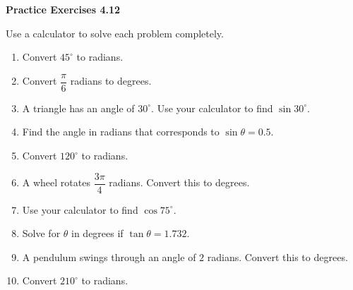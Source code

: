\vspace{0.3ex}
\noindent\textbf{Practice Exercises 4.12}

\vspace{0.2ex}

Use a calculator to solve each problem completely.

\begin{enumerate}
    \item Convert \(45^\circ\) to radians.
    \item Convert \( \dfrac{\pi}{6} \) radians to degrees.
    \item A triangle has an angle of \(30^\circ\). Use your calculator to find \(\sin 30^\circ\).
    \item Find the angle in radians that corresponds to \(\sin \theta = 0.5\).
    \item Convert \(120^\circ\) to radians.
    \item A wheel rotates \( \dfrac{3\pi}{4} \) radians. Convert this to degrees.
    \item Use your calculator to find \(\cos 75^\circ\).
    \item Solve for \(\theta\) in degrees if \(\tan \theta = 1.732\).
    \item A pendulum swings through an angle of \(2\) radians. Convert this to degrees.
    \item Convert \(210^\circ\) to radians.
\end{enumerate}
